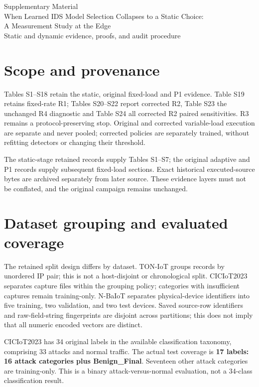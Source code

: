 \documentclass[10pt,a4paper]{article}
\begin{document}
\begin{center}
{\LARGE Supplementary Material}\\[6pt]
{\large When Learned IDS Model Selection Collapses to a Static Choice:\\A Measurement Study at the Edge}\\[6pt]
Static and dynamic evidence, proofs, and audit procedure
\end{center}

\section{Scope and provenance}
Tables S1--S18 retain the static, original fixed-load and P1 evidence. Table S19 retains fixed-rate R1; Tables S20--S22 report corrected R2, Table S23 the unchanged R4 diagnostic and Table S24 all corrected R2 paired sensitivities. R3 remains a protocol-preserving stop. Original and corrected variable-load execution are separate and never pooled; corrected policies are separately trained, without refitting detectors or changing their threshold.

The static-stage retained records supply Tables S1--S7; the original adaptive and P1 records supply subsequent fixed-load sections. Exact historical executed-source bytes are archived separately from later source. These evidence layers must not be conflated, and the original campaign remains unchanged.

\section{Dataset grouping and evaluated coverage}
The retained split design differs by dataset. TON-IoT groups records by unordered IP pair; this is not a host-disjoint or chronological split. CICIoT2023 separates capture files within the grouping policy; categories with insufficient captures remain training-only. N-BaIoT separates physical-device identifiers into five training, two validation, and two test devices. Saved source-row identifiers and raw-field-string fingerprints are disjoint across partitions; this does not imply that all numeric encoded vectors are distinct.

CICIoT2023 has 34 original labels in the available classification taxonomy, comprising 33 attacks and normal traffic. The actual test coverage is \textbf{17 labels: 16 attack categories plus Benign\_Final}. Seventeen other attack categories are training-only. This is a binary attack-versus-normal evaluation, not a 34-class classification result.
\end{document}
